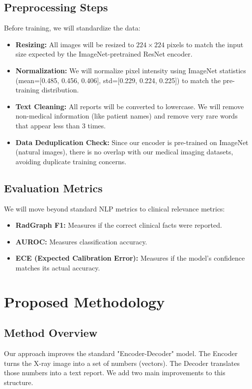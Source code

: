 \documentclass[11pt,a4paper]{article}
\begin{document}
\subsection{Preprocessing Steps}
Before training, we will standardize the data:
\begin{itemize}
    \item \textbf{Resizing:} All images will be resized to $224 \times 224$ pixels to match the input size expected by the ImageNet-pretrained ResNet encoder.
    \item \textbf{Normalization:} We will normalize pixel intensity using ImageNet statistics (mean=[0.485, 0.456, 0.406], std=[0.229, 0.224, 0.225]) to match the pre-training distribution.
    \item \textbf{Text Cleaning:} All reports will be converted to lowercase. We will remove non-medical information (like patient names) and remove very rare words that appear less than 3 times.
    \item \textbf{Data Deduplication Check:} Since our encoder is pre-trained on ImageNet (natural images), there is no overlap with our medical imaging datasets, avoiding duplicate training concerns.
\end{itemize}

\subsection{Evaluation Metrics}
We will move beyond standard NLP metrics to clinical relevance metrics:
\begin{itemize}
    \item \textbf{RadGraph F1:} Measures if the correct clinical facts were reported.
    \item \textbf{AUROC:} Measures classification accuracy.
    \item \textbf{ECE (Expected Calibration Error):} Measures if the model's confidence matches its actual accuracy.
\end{itemize}

\section{Proposed Methodology}

\subsection{Method Overview}
Our approach improves the standard "Encoder-Decoder" model. The Encoder turns the X-ray image into a set of numbers (vectors). The Decoder translates those numbers into a text report. We add two main improvements to this structure.
\end{document}
